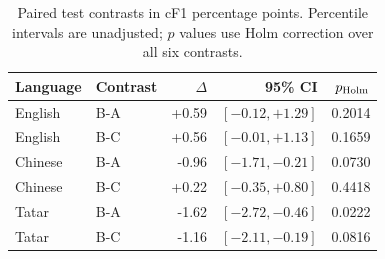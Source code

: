 \begin{table}[t]
\centering\small
\caption{Paired test contrasts in cF1 percentage points. Percentile intervals are unadjusted; $p$ values use Holm correction over all six contrasts.}\label{tab:contrasts}
\begin{tabular}{llrrr}
\toprule
Language & Contrast & $\Delta$ & 95\% CI & $p_{\rm Holm}$ \\
\midrule
English & B-A & +0.59 & $[-0.12,+1.29]$ & 0.2014 \\
English & B-C & +0.56 & $[-0.01,+1.13]$ & 0.1659 \\
Chinese & B-A & -0.96 & $[-1.71,-0.21]$ & 0.0730 \\
Chinese & B-C & +0.22 & $[-0.35,+0.80]$ & 0.4418 \\
Tatar & B-A & -1.62 & $[-2.72,-0.46]$ & 0.0222 \\
Tatar & B-C & -1.16 & $[-2.11,-0.19]$ & 0.0816 \\
\bottomrule
\end{tabular}
\end{table}
